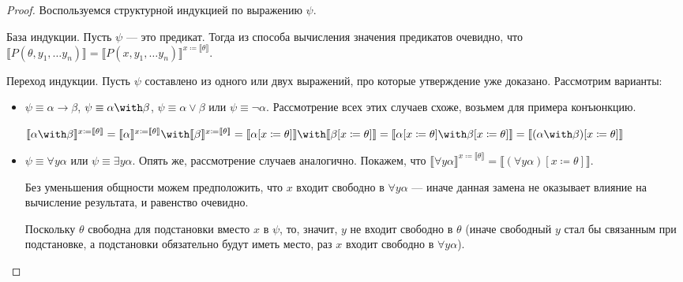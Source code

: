 \begin{proof}
Воспользуемся структурной индукцией по выражению $\psi$.

База индукции. Пусть $\psi$ --- это предикат. Тогда из способа вычисления значения предикатов 
очевидно, что
$\llbracket P(\theta,y_1,\dots y_n) \rrbracket = \llbracket P(x,y_1,\dots y_n)\rrbracket^{x \coloneqq  \llbracket \theta \rrbracket}$.

Переход индукции. Пусть $\psi$ составлено из одного или двух выражений, про которые
утверждение уже доказано. Рассмотрим варианты:

\begin{itemize}
\item $\psi \equiv \alpha \rightarrow \beta$, $\psi \equiv \alpha \with \beta$, $\psi \equiv \alpha \vee \beta$ или
$\psi \equiv \neg \alpha$. Рассмотрение всех этих случаев схоже, возьмем для примера конъюнкцию.

$\llbracket\alpha\with\beta\rrbracket^{x\coloneqq \llbracket\theta\rrbracket}
=\llbracket\alpha\rrbracket^{x\coloneqq \llbracket\theta\rrbracket}\with\llbracket\beta\rrbracket^{x\coloneqq \llbracket\theta\rrbracket}
=\llbracket\alpha[x \coloneqq  \theta]\rrbracket\with\llbracket\beta[x\coloneqq \theta]\rrbracket
=\llbracket\alpha[x \coloneqq  \theta]\with\beta[x \coloneqq  \theta]\rrbracket = \llbracket(\alpha\with\beta)[x \coloneqq  \theta]\rrbracket$

\item $\psi \equiv \forall y \alpha$ или $\psi \equiv \exists y \alpha$. Опять же, рассмотрение случаев
аналогично. Покажем, что 
$\llbracket \forall y \alpha \rrbracket^{x \coloneqq  \llbracket\theta\rrbracket} = \llbracket (\forall y \alpha)[x\coloneqq \theta] \rrbracket$.

Без уменьшения общности можем предположить, что $x$ входит свободно в $\forall y\alpha$ --- иначе данная замена
не оказывает влияние на вычисление результата, и равенство очевидно.

Поскольку $\theta$ свободна для подстановки вместо $x$ в $\psi$, то, значит, 
$y$ не входит свободно в $\theta$ (иначе свободный $y$ стал бы связанным при подстановке,
а подстановки обязательно будут иметь место, раз $x$ входит свободно в $\forall y\alpha$).



\end{itemize}
\end{proof}
